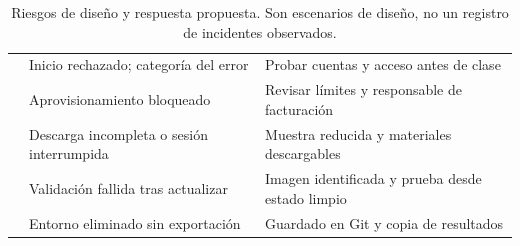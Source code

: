 \begin{table}[tbp]
\caption{Riesgos de diseño y respuesta propuesta. Son escenarios de diseño, no un registro de incidentes observados.}\label{tab:riesgos}
\begin{tabularx}{\linewidth}{@{}>{\RaggedRight\arraybackslash}p{34mm}YY@{}}
\toprule
{} &  &  \\
\midrule
{} & Inicio rechazado; categoría del error & Probar cuentas y acceso antes de clase \\
\addlinespace
{} & Aprovisionamiento bloqueado & Revisar límites y responsable de facturación \\
\addlinespace
{} & Descarga incompleta o sesión interrumpida & Muestra reducida y materiales descargables \\
\addlinespace
{} & Validación fallida tras actualizar & Imagen identificada y prueba desde estado limpio \\
\addlinespace
{} & Entorno eliminado sin exportación & Guardado en Git y copia de resultados \\
\bottomrule
\end{tabularx}
\end{table}
